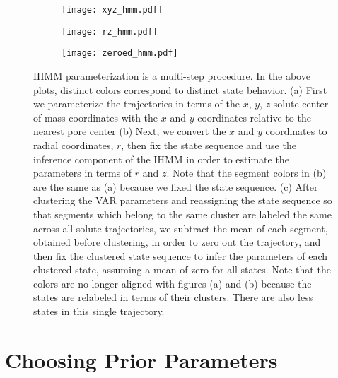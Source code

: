   \begin{figure}
    \centering
	\begin{subfigure}{0.75\textwidth}
		\texttt{[image: xyz\_hmm.pdf]}
		\caption{}\label{fig:xyz_hmm}
	\end{subfigure}  	
	\begin{subfigure}{0.75\textwidth}
		\texttt{[image: rz\_hmm.pdf]}
		\caption{}\label{fig:rz_hmm}
	\end{subfigure}  
	\begin{subfigure}{0.75\textwidth}
		\texttt{[image: zeroed\_hmm.pdf]}
		\caption{}\label{fig:zeroed_hmm}
	\end{subfigure}  
	\caption{IHMM parameterization is a multi-step procedure. In the above plots, distinct colors
	correspond to distinct state behavior. (a) First we parameterize the trajectories in terms of
	the $x$, $y$, $z$ solute center-of-mass coordinates with the $x$ and $y$ coordinates relative
	to the nearest pore center (b) Next, we convert the $x$ and $y$ 	
	coordinates to radial coordinates, $r$, then fix the state sequence and use the inference 
	component of the IHMM in order to estimate the parameters in terms of $r$ and $z$. Note that
	the segment colors in (b) are the same as (a) because we fixed the state sequence.
	(c) After clustering the VAR parameters and reassigning the state sequence so that segments 
	which belong to the same cluster are labeled the same across all solute trajectories, we subtract
	the mean of each segment, obtained before clustering, in order to zero out the
  	trajectory, and then fix the clustered state sequence to infer the parameters of each clustered 
  	state, assuming a mean of zero for all states. Note that the colors are no longer aligned with 
  	figures (a) and (b) because the states are relabeled in terms of their clusters. There are
  	also less states in this single trajectory.
	}\label{fig:hmm_demo}
  \end{figure}
  
  \newpage
  
  \section{Choosing Prior Parameters}\label{section:prior_guesses}  
  

